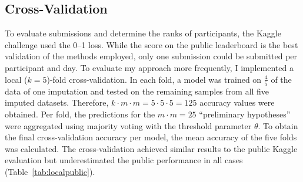 \documentclass[a4paper,11pt]{article}
\begin{document}
\subsection{Cross-Validation}
\label{sec:cross}

To evaluate submissions and determine the ranks of participants, the
Kaggle challenge used the 0--1 loss. While the score on the public
leaderboard is the best validation of the methods employed, only one
submission could be submitted per participant and day. To evaluate my
approach more frequently, I implemented a local ($k = 5$)-fold
cross-validation. In each fold, a model was trained on $\frac{4}{5}$
of the data of one imputation and tested on the remaining samples from
all five imputed datasets. Therefore,
$k \cdot m \cdot m = 5 \cdot 5 \cdot 5 = 125$ accuracy values were
obtained. Per fold, the predictions for the $m \cdot m = 25$
``preliminary hypotheses'' were aggregated using majority voting with
the threshold parameter $\theta$. To obtain the final cross-validation
accuracy per model, the mean accuracy of the five folds was
calculated. The cross-validation achieved similar results to the
public Kaggle evaluation but underestimated the public performance in
all cases (Table~\ref{tab:localpublic}).
\end{document}
